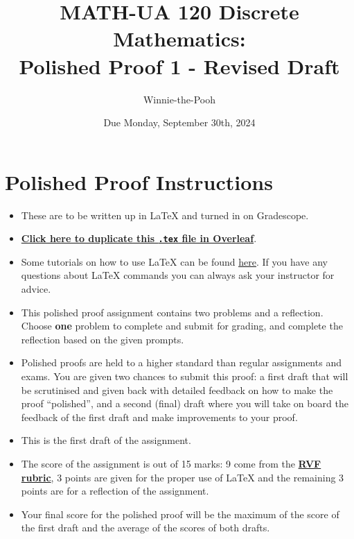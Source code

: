 \documentclass{article}
\title{\textbf{MATH-UA 120 Discrete Mathematics: \\ Polished Proof 1 - Revised Draft}}
\author{%
    Winnie-the-Pooh %
}
\date{Due Monday, September 30th, 2024} %
\theoremstyle{definition}
\begin{document}
\maketitle %

\vfill


\section*{Polished Proof Instructions}

\begin{itemize}
    \item These are to be written up in \LaTeX{} and turned in on Gradescope.
    \item \href{https://bit.ly/4gxMEGA}{\textbf{Click here to duplicate this \texttt{.tex} file in Overleaf}}.
    \item Some tutorials on how to use \LaTeX{} can be found \href{https://www.overleaf.com/learn/latex/Tutorials}{\underline{here}}. If you have any questions about \LaTeX{} commands you can always ask your instructor for advice.
    \item This polished proof assignment contains two problems and a reflection. Choose \textbf{one} problem to complete and submit for grading, and complete the reflection based on the given prompts.
    \item Polished proofs are held to a higher standard than regular assignments and exams. You are given two chances to submit this proof: a first draft that will be scrutinised and given back with detailed feedback on how to make the proof ``polished'', and a second (final) draft where you will take on board the feedback of the first draft and make improvements to your proof.
    \item This is the first draft of the assignment.
    \item The score of the assignment is out of 15 marks: 9 come from the \href{https://drive.google.com/file/d/1YZhhGv5OyPdx0-VDa6i6cftkzPromMRY/view?usp=drive_link}{\textbf{RVF rubric}}, 3 points are given for the proper use of \LaTeX{} and the remaining 3 points are for a reflection of the assignment.
    \item Your final score for the polished proof will be the maximum of the score of the first draft and the average of the scores of both drafts.
\end{itemize}
\end{document}
